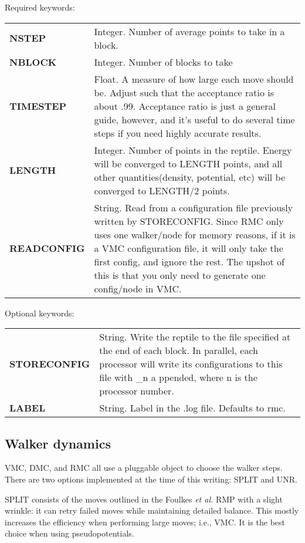 \documentclass[12pt]{article}
\begin{document}
Required keywords:\\
\begin{tabular}{lp{12cm}}
{\bf NSTEP } & Integer.   Number of average points to take in a block. \\
{\bf NBLOCK} & Integer. Number of blocks to take \\
{\bf TIMESTEP} & Float. A measure of how large each move 
should be.  Adjust such that the acceptance ratio is about .99. Acceptance ratio
is just a general guide, however, and it's useful to do several time steps if you
need highly accurate results. \\
{\bf LENGTH} & Integer.  Number of points in the reptile.  Energy will be converged 
to LENGTH points, and all other quantities(density, potential, etc) will be converged to LENGTH/2 points. \\
{\bf READCONFIG } & String. Read from a configuration file
previously written by STORECONFIG.  Since RMC only uses one walker/node for memory reasons, if it is a VMC
configuration file, it will only take the first config, and ignore the rest.  The upshot of this is that you
only need to generate one config/node in VMC. \\
\end{tabular}


Optional keywords: \\
\begin{tabular}{lp{12cm}}
{\bf STORECONFIG } & String. Write the reptile to the file specified at the end of each block.  In parallel, each processor will write its configurations to this file with \_n a
ppended, where n is the processor number. \\
{\bf LABEL} & String.  Label in the .log file.  Defaults to rmc.\\
\end{tabular}

\newpage 

\subsection{Walker dynamics}

VMC, DMC, and RMC all use a pluggable object to choose the walker steps.  There are
two options implemented at the time of this writing: SPLIT and UNR. 

 SPLIT consists
of the moves outlined in the Foulkes {\it et al.} RMP with a slight wrinkle: it 
can retry failed moves while maintaining detailed balance.  This mostly increases 
the efficiency when performing large moves; i.e., VMC.  It is the best 
choice when using pseudopotentials.
\end{document}
